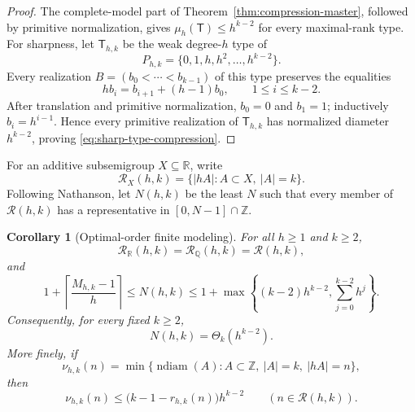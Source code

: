 \documentclass[11pt,reqno]{amsart}
\newtheorem{corollary}[theorem]{Corollary}
\theoremstyle{definition}
\theoremstyle{remark}
\newcommand{\Rcal}{\mathcal R}
\newcommand{\ndiam}{\operatorname{ndiam}}
\begin{document}
\begin{proof}
The complete-model part of Theorem~\ref{thm:compression-master}, followed by
primitive normalization, gives $\mu_h(\mathsf T)\leq h^{k-2}$ for every
maximal-rank type.  For sharpness, let $\mathsf T_{h,k}$ be the weak
degree-$h$ type of
\[
 P_{h,k}=\{0,1,h,h^2,\ldots,h^{k-2}\}.
\]
Every realization $B=(b_0<\cdots<b_{k-1})$ of this type preserves the
equalities
\[
 h b_i=b_{i+1}+(h-1)b_0,
 \qquad 1\leq i\leq k-2.
\]
After translation and primitive normalization, $b_0=0$ and $b_1=1$;
inductively $b_i=h^{i-1}$.  Hence every primitive realization of
$\mathsf T_{h,k}$ has normalized diameter $h^{k-2}$, proving
\eqref{eq:sharp-type-compression}.
\end{proof}

For an additive subsemigroup $X\subseteq\mathbb R$, write
\[
 \Rcal_X(h,k)=\{|hA|:A\subset X,\ |A|=k\}.
\]
Following Nathanson, let $N(h,k)$ be the least $N$ such that every member of
$\Rcal(h,k)$ has a representative in $[0,N-1]\cap\mathbb Z$.

\begin{corollary}[Optimal-order finite modeling]
\label{cor:optimal-finite-modeling}
For all $h\geq1$ and $k\geq2$,
\begin{equation}\label{eq:real-integer-spectrum}
 \Rcal_{\mathbb R}(h,k)=\Rcal_{\mathbb Q}(h,k)=\Rcal(h,k),
\end{equation}
and
\begin{equation}\label{eq:compression-master-bounds}
 1+\left\lceil\frac{M_{h,k}-1}{h}\right\rceil
 \leq N(h,k)
 \leq 1+\max\left\{(k-2)h^{k-2},
                    \sum_{j=0}^{k-2}h^j\right\}.
\end{equation}
Consequently, for every fixed $k\geq2$,
\begin{equation}\label{eq:optimal-compression-order}
 N(h,k)=\Theta_k(h^{k-2}).
\end{equation}
More finely, if
\[
 \nu_{h,k}(n)=\min\{\ndiam(A):A\subset\mathbb Z,\ |A|=k,\ |hA|=n\},
\]
then
\begin{equation}\label{eq:valuewise-rank-compression}
 \nu_{h,k}(n)
 \leq\bigl(k-1-r_{h,k}(n)\bigr)h^{k-2}
 \qquad(n\in\Rcal(h,k)).
\end{equation}
\end{corollary}
\end{document}
